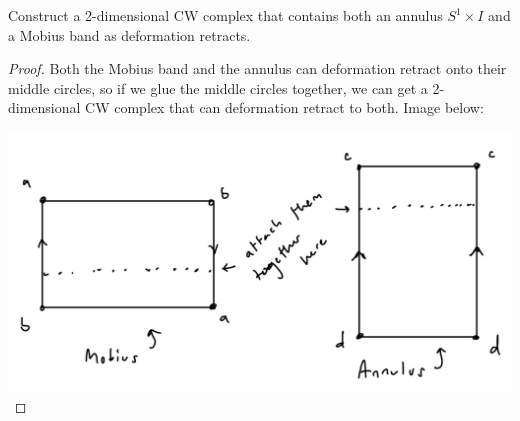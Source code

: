 \documentclass[12pt]{article}
\newenvironment{statement}[2][Statement]{\begin{trivlist}
\item[\hskip \labelsep {\bfseries #1}\hskip \labelsep {\bfseries #2.}]}{\end{trivlist}}
\begin{document}
\begin{statement}[Exercise]{0.17b}
    Construct a 2-dimensional CW complex that contains both an annulus $S^1 \times I$ and a Mobius band as deformation retracts. 
\end{statement}
\begin{proof}
    Both the Mobius band and the annulus can deformation retract onto their middle circles, so if we glue the middle circles together, we can get a 2-dimensional CW complex that can deformation retract to both. Image below:
    \par \includegraphics[scale=.3]{1.17.2.jpg}
\end{proof}
\end{document}
